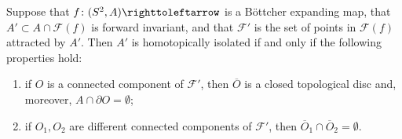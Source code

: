 \documentclass{amsart}
\newcommand\Fatou{{\mathcal F}}
\begin{document}
\begin{lem}\label{lem:HomIsolCond}
  Suppose that $f\colon (S^2,A)\selfmap$ is a B\"ottcher expanding
  map, that $A'\subset A\cap \Fatou(f)$ is forward invariant, and that
  $\Fatou'$ is the set of points in $\Fatou(f)$ attracted by
  $A'$. Then $A'$ is homotopically isolated if and only if the
  following properties hold:
  \begin{enumerate}
  \item if $O$ is a connected component of $\Fatou'$, then
    $\overline O$ is a closed topological disc and, moreover,
    $A\cap\partial O=\emptyset$;
  \item if $O_1,O_2$ are different connected components of
    $\Fatou'$, then $\overline O_1\cap \overline O_2=\emptyset$.
  \end{enumerate}
\end{lem}
\end{document}
